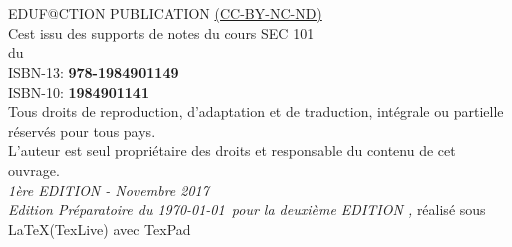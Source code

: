 
\newpage

~\vfill
\thispagestyle{empty}

\noindent {\Huge\ccbyncndeu}\\ 

 EDUF@CTION PUBLICATION \href{https://creativecommons.org/licenses/by-nc-nd/2.0/fr/}{(CC-BY-NC-ND)}\\ %

\noindent C\edoc est issu des supports de notes du cours SEC 101\\ 
du \uCnam \\

\noindent ISBN-13: \textbf{978-1984901149} \\

\noindent ISBN-10: \textbf{1984901141} \\

\noindent Tous droits de reproduction, d’adaptation et de traduction, intégrale ou partielle réservés pour tous pays.\\

\noindent L’auteur est seul propriétaire des droits et responsable du contenu de cet ouvrage.\\

\noindent \textit{1ère EDITION - Novembre 2017} \\

\noindent \textit{Edition Préparatoire du \today~pour la deuxième EDITION  \printer, } réalisé sous \LaTeX (TexLive) avec TexPad \faApple